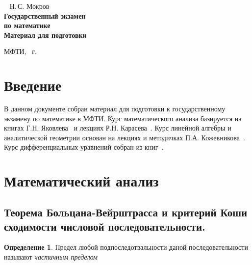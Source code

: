 \documentclass{urticle}
\theoremstyle{definition}
\newtheorem{definition}{Определение}
\begin{document}
\begin{titlepage}

    \begin{center}
        ~\vfill
        \Huge Н.\,С. Мокров\\[5mm]
        \Huge\textbf{Государственный экзамен\\по математике}\\[5mm]
        \LARGE\textbf{Материал для подготовки}
    \end{center}

    \vfill\vspace{2cm}
    \centerline{МФТИ, \the\year~г.}
\end{titlepage}

\tableofcontents
\newpage

\section*{Введение}
\label{Intro}
В данном документе собран материал для подготовки к государственному экзамену по математике в МФТИ. Курс математического анализа базируется на книгах Г.Н. Яковлева~\cite{Yakovlev} и лекциях Р.Н. Карасева~\cite{Karasev}. Курс линейной алгебры и аналитической геометрии основан на лекциях и методичках П.А. Кожевникова~\cite{Kozhevnikov}. Курс дифференциальных уравнений собран из книг~\cite{Diff1}.

\section{Математический анализ}
\label{MathAnalysis}

\subsection{Теорема Больцана-Вейрштрасса и критерий Коши сходимости числовой последовательности.}
    
    \begin{definition}
    \label{def:PartialLimit}
        Предел любой подпоследотвальности даной последовательности называют \textit{частичным пределом}
    \end{definition}    
    
\end{document}
